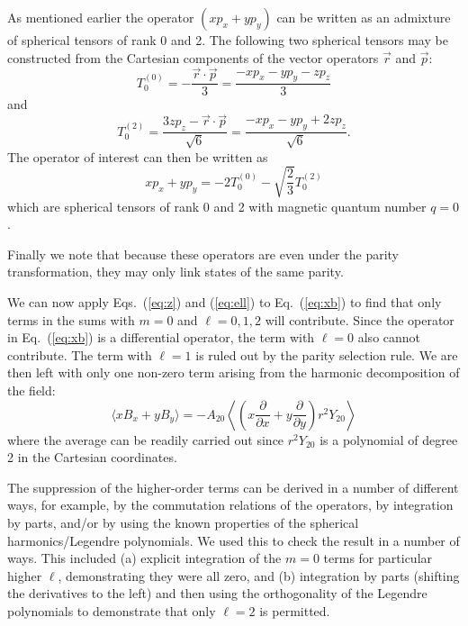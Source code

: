 \documentclass[preprint,12pt]{elsarticle}
\begin{document}
As mentioned earlier the operator $(xp_x+yp_y)$ can be written as an
admixture of spherical tensors of rank 0 and 2.  The following two
spherical tensors may be constructed from the Cartesian components of
the vector operators $\vec{r}$ and $\vec{p}$:
\begin{equation}
T_0^{(0)}=-\frac{\vec{r}\cdot\vec{p}}{3}=\frac{-xp_x-yp_y-zp_z}{3}
\end{equation}
and
\begin{equation}
T_0^{(2)}=\frac{3zp_z-\vec{r}\cdot\vec{p}}{\sqrt{6}}=\frac{-xp_x-yp_y+2zp_z}{\sqrt{6}}.
\end{equation}
The operator of interest can then be written as
\begin{equation}
xp_x+yp_y=-2T_0^{(0)}-\sqrt{\frac{2}{3}}T_0^{(2)}
\end{equation}
which are spherical tensors of rank 0 and 2 with magnetic quantum
number $q=0$.

Finally we note that because these operators are even under the parity
transformation, they may only link states of the same parity.

We can now apply Eqs.~(\ref{eq:z}) and (\ref{eq:ell}) to
Eq.~(\ref{eq:xb}) to find that only terms in the sums with $m=0$ and
$\ell=0,1,2$ will contribute.  Since the operator in Eq.~(\ref{eq:xb})
is a differential operator, the term with $\ell=0$ also cannot
contribute.  The term with $\ell=1$ is ruled out by the parity
selection rule.  We are then left with only one non-zero term arising
from the harmonic decomposition of the field:
\begin{equation}
\langle
xB_x+yB_y\rangle=-A_{20}\left\langle\left(x\frac{\partial}{\partial
  x}+y\frac{\partial}{\partial y}\right)r^2 Y_{20}\right\rangle
\end{equation}
where the average can be readily carried out since $r^2Y_{20}$ is a
polynomial of degree 2 in the Cartesian coordinates.

The suppression of the higher-order terms can be derived in a number
of different ways, for example, by the commutation relations of the
operators, by integration by parts, and/or by using the known
properties of the spherical harmonics/Legendre polynomials.  We used
this to check the result in a number of ways.  This included (a)
explicit integration of the $m=0$ terms for particular higher $\ell$,
demonstrating they were all zero, and (b) integration by parts
(shifting the derivatives to the left) and then using the
orthogonality of the Legendre polynomials to demonstrate that only
$\ell=2$ is permitted.
\end{document}

